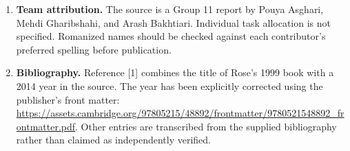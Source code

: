 \documentclass[11pt,a4paper]{article}
\begin{document}
\begin{enumerate}
\item \textbf{Team attribution.} The source is a Group 11 report by Pouya Asghari, Mehdi Gharibshahi, and Arash Bakhtiari. Individual task allocation is not specified. Romanized names should be checked against each contributor's preferred spelling before publication.
\item \textbf{Bibliography.} Reference [1] combines the title of Rose's 1999 book with a 2014 year in the source. The year has been explicitly corrected using the publisher's front matter: \url{https://assets.cambridge.org/97805215/48892/frontmatter/9780521548892_frontmatter.pdf}. Other entries are transcribed from the supplied bibliography rather than claimed as independently verified.
\end{enumerate}
\end{document}
